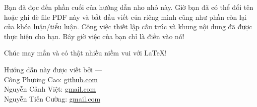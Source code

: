 Bạn đã đọc đến phần cuối của hướng dẫn nho nhỏ này. Giờ bạn đã có thể đổi tên hoặc ghi đè file PDF này và bắt đầu viết  của riêng mình cũng như phần còn lại của khóa luận/tiểu luận. Công việc thiết lập cấu trúc và khung nội dung đã được thực hiện cho bạn. Bây giờ việc của bạn chỉ là điền vào nó!

Chúc may mắn và có thật nhiều niềm vui với \LaTeX{}!

\begin{flushright}
Hướng dẫn này được viết bởi ---\\
Công Phương Cao: \href{https://github.com/cpc1996}{github.com}\\
Nguyễn Cảnh Việt: \href{mailto:vietncp@gmail.com}{gmail.com}\\
Nguyễn Tiến Cường: \href{mailto:ngtiencuong@gmail.com}{gmail.com}
\end{flushright}



